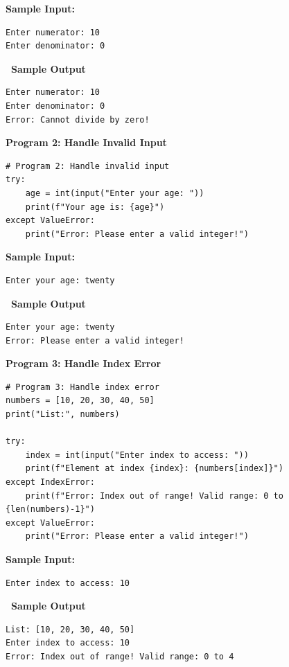 \documentclass[12pt,a4paper]{article}
\newcommand{\outhead}{\noindent\colorbox{cmrgreen!25}%
  {\textbf{\small\color{cmrdark}~Sample Output~}}\par\vspace{-1pt}}
\begin{document}
\textbf{Sample Input:}
\begin{verbatim}
Enter numerator: 10
Enter denominator: 0
\end{verbatim}

\outhead
\begin{lstlisting}[style=outputstyle]
Enter numerator: 10
Enter denominator: 0
Error: Cannot divide by zero!
\end{lstlisting}

\vspace{0.5cm}

\textbf{Program 2: Handle Invalid Input}

\begin{lstlisting}
# Program 2: Handle invalid input
try:
    age = int(input("Enter your age: "))
    print(f"Your age is: {age}")
except ValueError:
    print("Error: Please enter a valid integer!")
\end{lstlisting}

\textbf{Sample Input:}
\begin{verbatim}
Enter your age: twenty
\end{verbatim}

\outhead
\begin{lstlisting}[style=outputstyle]
Enter your age: twenty
Error: Please enter a valid integer!
\end{lstlisting}

\vspace{0.5cm}

\textbf{Program 3: Handle Index Error}

\begin{lstlisting}
# Program 3: Handle index error
numbers = [10, 20, 30, 40, 50]
print("List:", numbers)

try:
    index = int(input("Enter index to access: "))
    print(f"Element at index {index}: {numbers[index]}")
except IndexError:
    print(f"Error: Index out of range! Valid range: 0 to {len(numbers)-1}")
except ValueError:
    print("Error: Please enter a valid integer!")
\end{lstlisting}

\textbf{Sample Input:}
\begin{verbatim}
Enter index to access: 10
\end{verbatim}

\outhead
\begin{lstlisting}[style=outputstyle]
List: [10, 20, 30, 40, 50]
Enter index to access: 10
Error: Index out of range! Valid range: 0 to 4
\end{lstlisting}
\end{document}
